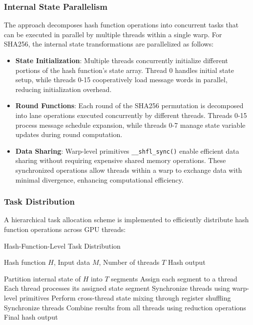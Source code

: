 \documentclass[journal]{IEEEtran}
\begin{document}
\subsubsection{Internal State Parallelism}


The approach decomposes hash function operations into concurrent tasks that can be executed in parallel by multiple threads within a single warp. For SHA256, the internal state transformations are parallelized as follows:

\begin{itemize}
  \item \textbf{State Initialization}: Multiple threads concurrently initialize different portions of the hash function's state array. Thread 0 handles initial state setup, while threads 0-15 cooperatively load message words in parallel, reducing initialization overhead.

  \item \textbf{Round Functions}: Each round of the SHA256 permutation is decomposed into lane operations executed concurrently by different threads. Threads 0-15 process message schedule expansion, while threads 0-7 manage state variable updates during round computation.

  \item \textbf{Data Sharing}: Warp-level primitives  \texttt{\_\_shfl\_sync()} enable efficient data sharing without requiring expensive shared memory operations. These synchronized operations allow threads within a warp to exchange data with minimal divergence, enhancing computational efficiency.
\end{itemize}

\subsubsection{Task Distribution }

A hierarchical task allocation scheme is implemented to efficiently distribute hash function operations across GPU threads:

\begin{algorithm}
  \caption{Hash-Function-Level Task Distribution}
  \begin{algorithmic}[1]
    \REQUIRE Hash function $H$, Input data $M$, Number of threads $T$
    \ENSURE Hash output

    \STATE Partition internal state of $H$ into $T$ segments
    \STATE Assign each segment to a thread
    \STATE Each thread processes its assigned state segment
    \STATE Synchronize threads using warp-level primitives
    \STATE Perform cross-thread state mixing through register shuffling
    \STATE Synchronize threads
    \ENDFOR
    \STATE Combine results from all threads using reduction operations
    \RETURN Final hash output
  \end{algorithmic}
\end{algorithm}
\end{document}
